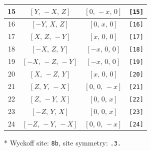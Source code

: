 \documentclass[fleqn,8pt]{jsarticle}
\begin{document}
\begin{longtable}{cccc}
15 & $\left[ Y,\, - X,\, Z \right]$ & $\left[ 0,\, - x,\, 0 \right]$ & {\tt [15]} \\ \hline
16 & $\left[ - Y,\, X,\, Z \right]$ & $\left[ 0,\, x,\, 0 \right]$ & {\tt [16]} \\ \hline
17 & $\left[ X,\, Z,\, - Y \right]$ & $\left[ x,\, 0,\, 0 \right]$ & {\tt [17]} \\ \hline
18 & $\left[ - X,\, Z,\, Y \right]$ & $\left[ - x,\, 0,\, 0 \right]$ & {\tt [18]} \\ \hline
19 & $\left[ - X,\, - Z,\, - Y \right]$ & $\left[ - x,\, 0,\, 0 \right]$ & {\tt [19]} \\ \hline
20 & $\left[ X,\, - Z,\, Y \right]$ & $\left[ x,\, 0,\, 0 \right]$ & {\tt [20]} \\ \hline
21 & $\left[ Z,\, Y,\, - X \right]$ & $\left[ 0,\, 0,\, - x \right]$ & {\tt [21]} \\ \hline
22 & $\left[ Z,\, - Y,\, X \right]$ & $\left[ 0,\, 0,\, x \right]$ & {\tt [22]} \\ \hline
23 & $\left[ - Z,\, Y,\, X \right]$ & $\left[ 0,\, 0,\, x \right]$ & {\tt [23]} \\ \hline
24 & $\left[ - Z,\, - Y,\, - X \right]$ & $\left[ 0,\, 0,\, - x \right]$ & {\tt [24]} \\
\end{longtable}
* Wyckoff site: {\tt 8b}, site symmetry: {\tt .3.}
\renewcommand{\arraystretch}{1.2}
\end{document}
